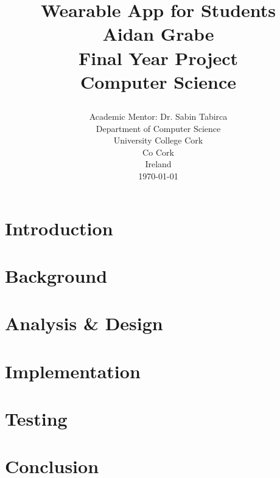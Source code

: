 \documentclass[12pt]{report}
\title{
    {\huge Wearable App for Students}\\
    {\textbf{Aidan Grabe}}\\
    {\vspace{12px}}
    {Final Year Project}\\
    {Computer Science}\\
    {\vspace{12px}}
    {\begin{figure}}
        \texttt{[image: ucc\_logo.jpg]}
    {\end{figure}}
}
\author {}
\date {
    {Academic Mentor: Dr. Sabin Tabirca}\\
    {Department of Computer Science}\\
    {University College Cork}\\
    {Co Cork}\\
    {Ireland}\\
    {\today}
}
\begin{document}
\maketitle




\tableofcontents

\chapter{Introduction}


\chapter{Background}


\chapter{Analysis \& Design}


\chapter{Implementation}


\chapter{Testing}


\chapter{Conclusion}

\end{document}

